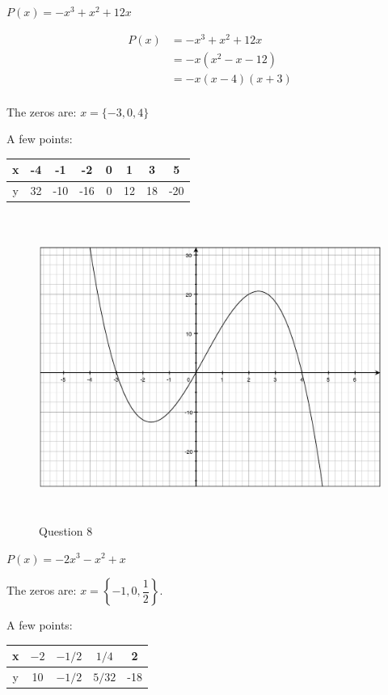 \documentclass[fleqn,addpoints]{exam}
\begin{document}
\begin{questions}
\question $P(x) = -x^3+x^2+12x$
\begin{solution}

\begin{align*}
  P(x) &= -x^3+x^2+12x \\
   &= -x(x^2-x-12) \\
   &= -x(x-4)(x+3) \\
\end{align*}

The zeros are: $x = \{-3, 0, 4\}$

A few points:
\begin{tabular}{|c|c|c|c|c|c|c|c|}
\hline
  x & -4 & -1  & -2  & 0 & 1  & 3 & 5 \\
\hline
  y & 32 & -10 & -16 & 0 & 12 & 18 & -20 \\
\hline
\end{tabular}

\begin{figure}[H]
  \centering
  \includegraphics[width=14cm,height=10cm]{question_8.eps}
  \caption*{Question 8}
\end{figure}

\end{solution}

\ifprintanswers
\pagebreak
\else
\fi

\question $P(x) = -2x^3-x^2+x$
\begin{solution}

The zeros are: $x = \left\{ -1, 0, \dfrac{1}{2} \right\}$.  

A few points:
\begin{tabular}{|c|c|c|c|c|}
\hline
  x & $-2$ & $-1/2$ & $1/4$  &  2  \\
\hline
  y & 10   & $-1/2$ & $5/32$ & -18 \\
\hline
\end{tabular}


\end{solution}
\end{questions}
\end{document}
